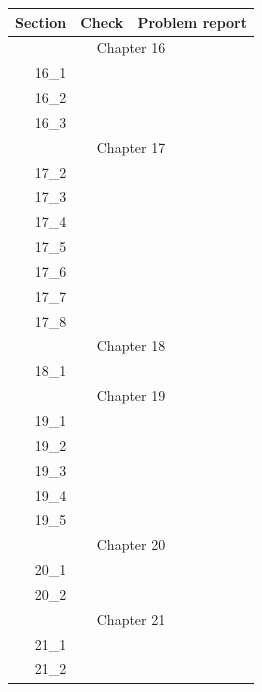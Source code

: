 \begin{tabular}{|r|r|p{8cm}|}
\hline
Section & Check & Problem report \\
\hline
\hline
\multicolumn{3}{|c|}{Chapter 16}\\
\hline
16\_1 & & \\
\hline
16\_2 & & \\
\hline
16\_3 & & \\
\hline
\hline
\multicolumn{3}{|c|}{Chapter 17}\\
\hline
17\_2 & & \\
\hline
17\_3 & & \\
\hline
17\_4 & & \\
\hline
17\_5 & & \\
\hline
17\_6 & & \\
\hline
17\_7 & & \\
\hline
17\_8 & & \\
\hline
\hline
\multicolumn{3}{|c|}{Chapter 18}\\
\hline
18\_1 & & \\
\hline
\hline
\multicolumn{3}{|c|}{Chapter 19}\\
\hline
19\_1 & & \\
\hline
19\_2 & & \\
\hline
19\_3 & & \\
\hline
19\_4 & & \\
\hline
19\_5 & & \\
\hline
\hline
\multicolumn{3}{|c|}{Chapter 20}\\
\hline
20\_1 & & \\
\hline
20\_2 & & \\
\hline
\hline
\multicolumn{3}{|c|}{Chapter 21}\\
\hline
21\_1 & & \\
\hline
21\_2 & & \\
\hline
\end{tabular}



